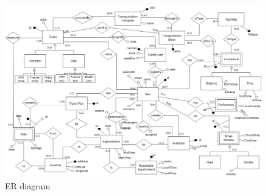    \begin{figure}[H]	
		\centerline{\includegraphics[width=0.9\paperwidth]{Images/ERdiagram}}
		\caption{ER diagram}
 	\end{figure}

	\filbreak
